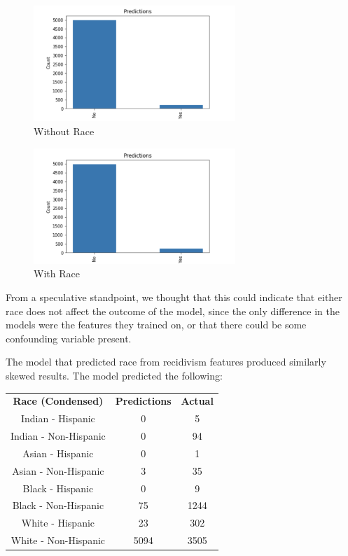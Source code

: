 \documentclass[11pt, sigconf]{acmart}
\begin{document}
\begin{figure}[h] 	
\centering
\includegraphics[width=3in]{2.png}
\caption{Without Race}
\end{figure}

\begin{figure}[h] 	
\centering
\includegraphics[width=3in]{3.png}
\caption{With Race}
\end{figure}

From a speculative standpoint, we thought that this could indicate that either race does not affect the outcome of the model, since the only difference in the models were the features they trained on, or that there could be some confounding variable present. 

The model that predicted race from recidivism features produced similarly skewed results. The model predicted the following:

\begin{tabular}{|c|c|c|}
\textbf{Race (Condensed)} & \textbf{Predictions} & \textbf{Actual} \\
 Indian  - Hispanic& 0 & 5 \\
Indian - Non-Hispanic& 0 & 94 \\
 Asian - Hispanic& 0 & 1\\
 Asian  - Non-Hispanic& 3 & 35\\
 Black - Hispanic&0 & 9 \\
 Black - Non-Hispanic& 75 &1244\\ 
 White - Hispanic& 23& 302 \\
 White - Non-Hispanic &5094&3505\\
\end{tabular}
\end{document}
